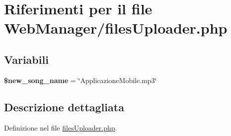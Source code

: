 \hypertarget{filesUploader_8php}{\section{\-Riferimenti per il file \-Web\-Manager/files\-Uploader.php}
\label{filesUploader_8php}
}
\subsection*{\-Variabili}
\begin{DoxyCompactItemize}
\item 
\hypertarget{filesUploader_8php_a2f8727fa0e1f4ff579f0f033929cb343}{{\bfseries \$new\-\_\-song\-\_\-name} = \char`\"{}\-Applicazione\-Mobile.\-mp3\char`\"{}}\label{filesUploader_8php_a2f8727fa0e1f4ff579f0f033929cb343}

\end{DoxyCompactItemize}


\subsection{\-Descrizione dettagliata}


\-Definizione nel file \hyperlink{filesUploader_8php_source}{files\-Uploader.\-php}.

